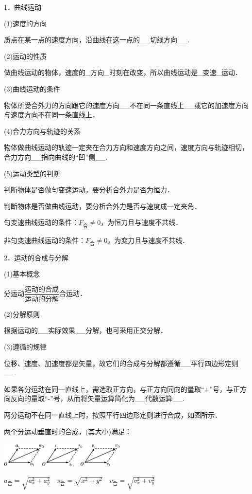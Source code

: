 \documentclass[cn,10.5pt,chinese,mac,chinesefont=founder]{elegantbook}
\begin{document}
1．曲线运动

(1)速度的方向

质点在某一点的速度方向，沿曲线在这一点的\_\_切线方向\_\_.

(2)运动的性质

做曲线运动的物体，速度的\_方向\_时刻在改变，所以曲线运动是\_变速\_运动．

(3)曲线运动的条件

物体所受合外力的方向跟它的速度方向\_\_不在同一条直线上\_\_或它的加速度方向与速度方向不在同一条直线上．

(4)合力方向与轨迹的关系

物体做曲线运动的轨迹一定夹在合力方向和速度方向之间，速度方向与轨迹相切，合力方向\_\_指向曲线的``凹''侧\_\_.

(5)运动类型的判断

判断物体是否做匀变速运动，要分析合外力是否为恒力．

判断物体是否做曲线运动，要分析合外力是否与速度成一定夹角．

匀变速曲线运动的条件：$F_{\text{合}}\neq 0$，为恒力且与速度不共线．

非匀变速曲线运动的条件：$F_{\text{合}}\neq 0$，为变力且与速度不共线．

2．运动的合成与分解

(1)基本概念

分运动$\dfrac{\text{运动的合成}}{\text{运动的分解}}$合运动．

(2)分解原则

根据运动的\_\_实际效果\_\_分解，也可采用正交分解．

(3)遵循的规律

位移、速度、加速度都是矢量，故它们的合成与分解都遵循\_\_平行四边形定则\_\_.

如果各分运动在同一直线上，需选取正方向，与正方向同向的量取``+''号，与正方向反向的量取``-''号，从而将矢量运算简化为\_\_代数运算\_\_.

两分运动不在同一直线上时，按照平行四边形定则进行合成，如图所示．

两个分运动垂直时的合成，(其大小)满足：

\begin{center}\includegraphics[width=2.48958in,height=0.5in]{media/image140.png}
	
\end{center}
$a_{\text{合}}=\sqrt{a^2_x+a^2_y}$　$s_{\text{合}}=\sqrt{x^2+y^2}$　$v_{\text{合}}=\sqrt{v^2_x+v^2_y}$
\end{document}
